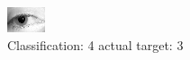 \begin{figure}[h!]
\begin{center}
\includegraphics[width=0.60\columnwidth]{figures/ID1301_class_4_target_3.png}
\end{center}
\caption{ Classification: 4 actual target: 3}
\label{fig:ID1301_class_4_target_3}
\end{figure}
